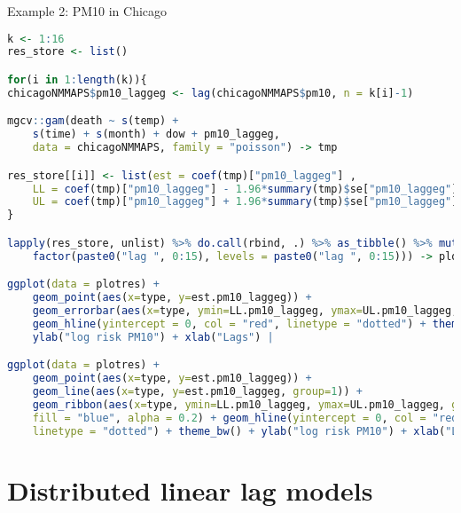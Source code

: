 \documentclass{beamer}
\begin{document}
\begin{frame}[fragile]{Example 2: PM10 in Chicago}
	\begin{lstlisting}[language=R, basicstyle=\tiny]
k <- 1:16
res_store <- list()

for(i in 1:length(k)){
chicagoNMMAPS$pm10_laggeg <- lag(chicagoNMMAPS$pm10, n = k[i]-1)

mgcv::gam(death ~ s(temp) + 
	s(time) + s(month) + dow + pm10_laggeg, 
	data = chicagoNMMAPS, family = "poisson") -> tmp

res_store[[i]] <- list(est = coef(tmp)["pm10_laggeg"] , 
	LL = coef(tmp)["pm10_laggeg"] - 1.96*summary(tmp)$se["pm10_laggeg"],
	UL = coef(tmp)["pm10_laggeg"] + 1.96*summary(tmp)$se["pm10_laggeg"])
}

lapply(res_store, unlist) %>% do.call(rbind, .) %>% as_tibble() %>% mutate(type = 
	factor(paste0("lag ", 0:15), levels = paste0("lag ", 0:15))) -> plotres

ggplot(data = plotres) + 
	geom_point(aes(x=type, y=est.pm10_laggeg)) + 
	geom_errorbar(aes(x=type, ymin=LL.pm10_laggeg, ymax=UL.pm10_laggeg, width = 0.1)) + 
	geom_hline(yintercept = 0, col = "red", linetype = "dotted") + theme_bw() +
	ylab("log risk PM10") + xlab("Lags") |

ggplot(data = plotres) + 
	geom_point(aes(x=type, y=est.pm10_laggeg)) + 
	geom_line(aes(x=type, y=est.pm10_laggeg, group=1)) +
	geom_ribbon(aes(x=type, ymin=LL.pm10_laggeg, ymax=UL.pm10_laggeg, group = 1), 
	fill = "blue", alpha = 0.2) + geom_hline(yintercept = 0, col = "red", 
	linetype = "dotted") + theme_bw() + ylab("log risk PM10") + xlab("Lags") 
	\end{lstlisting}
	
\end{frame}



\section{Distributed linear lag models}
\end{document}
